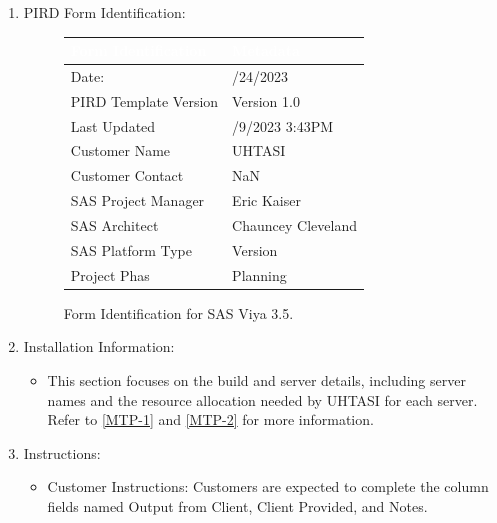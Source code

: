 \begin{enumerate}
    \item PIRD Form Identification:
    \begin{figure}[H]
    \begin{center}
        \renewcommand{\arraystretch}{1.5}
        \begin{tabular}{|>{\raggedright\arraybackslash}m{5cm}
                        |>{\raggedright\arraybackslash}m{4cm}
                        |}
        \hline
        \rowcolor[HTML]{196fb4}\centering\textcolor{white}{\large Form Identification} 
                                & \centering\textcolor{white}{\large Metadata} 
                                \tabularnewline 
        \hline
        Date: & 4/24/2023 \\\hline
        PIRD Template Version & Version 1.0 \\\hline
        Last Updated & 5/9/2023 3:43PM\\\hline
        Customer Name & UHTASI \\\hline
        Customer Contact & NaN \\\hline
        SAS Project Manager& Eric Kaiser \\\hline
        SAS Architect & Chauncey Cleveland \\\hline
        SAS Platform Type & Version \\\hline
        Project Phas & Planning \\\hline
        \end{tabular}
    \end{center}
    \caption{Form Identification for SAS Viya 3.5.}
    \label{PIRD-VIYA}
    \end{figure}
    \item Installation Information:
    \begin{itemize}
        \item This section focuses on the build and server details, including server names and the resource allocation needed by UHTASI for each server. Refer to \ref{MTP-1} and \ref{MTP-2} for more information.
    \end{itemize}
    \item Instructions:
    \begin{itemize}
        \item Customer Instructions: Customers are expected to complete the column fields named Output from Client, Client Provided, and Notes. 

\end{itemize}
\end{enumerate}
